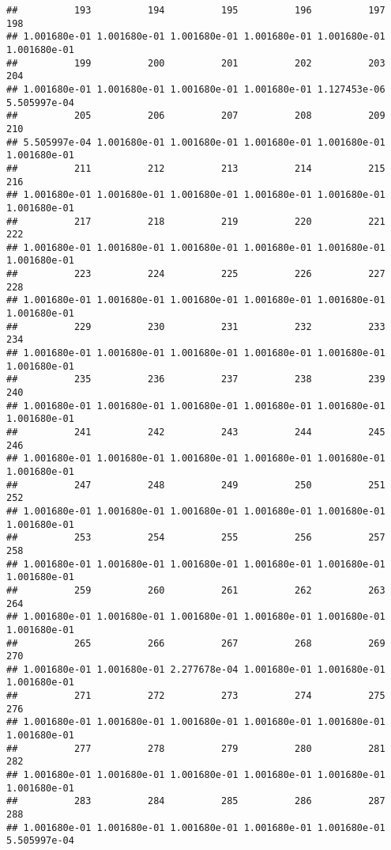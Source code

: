 \documentclass[
]{article}
\begin{document}
\begin{verbatim}
##          193          194          195          196          197          198 
## 1.001680e-01 1.001680e-01 1.001680e-01 1.001680e-01 1.001680e-01 1.001680e-01 
##          199          200          201          202          203          204 
## 1.001680e-01 1.001680e-01 1.001680e-01 1.001680e-01 1.127453e-06 5.505997e-04 
##          205          206          207          208          209          210 
## 5.505997e-04 1.001680e-01 1.001680e-01 1.001680e-01 1.001680e-01 1.001680e-01 
##          211          212          213          214          215          216 
## 1.001680e-01 1.001680e-01 1.001680e-01 1.001680e-01 1.001680e-01 1.001680e-01 
##          217          218          219          220          221          222 
## 1.001680e-01 1.001680e-01 1.001680e-01 1.001680e-01 1.001680e-01 1.001680e-01 
##          223          224          225          226          227          228 
## 1.001680e-01 1.001680e-01 1.001680e-01 1.001680e-01 1.001680e-01 1.001680e-01 
##          229          230          231          232          233          234 
## 1.001680e-01 1.001680e-01 1.001680e-01 1.001680e-01 1.001680e-01 1.001680e-01 
##          235          236          237          238          239          240 
## 1.001680e-01 1.001680e-01 1.001680e-01 1.001680e-01 1.001680e-01 1.001680e-01 
##          241          242          243          244          245          246 
## 1.001680e-01 1.001680e-01 1.001680e-01 1.001680e-01 1.001680e-01 1.001680e-01 
##          247          248          249          250          251          252 
## 1.001680e-01 1.001680e-01 1.001680e-01 1.001680e-01 1.001680e-01 1.001680e-01 
##          253          254          255          256          257          258 
## 1.001680e-01 1.001680e-01 1.001680e-01 1.001680e-01 1.001680e-01 1.001680e-01 
##          259          260          261          262          263          264 
## 1.001680e-01 1.001680e-01 1.001680e-01 1.001680e-01 1.001680e-01 1.001680e-01 
##          265          266          267          268          269          270 
## 1.001680e-01 1.001680e-01 2.277678e-04 1.001680e-01 1.001680e-01 1.001680e-01 
##          271          272          273          274          275          276 
## 1.001680e-01 1.001680e-01 1.001680e-01 1.001680e-01 1.001680e-01 1.001680e-01 
##          277          278          279          280          281          282 
## 1.001680e-01 1.001680e-01 1.001680e-01 1.001680e-01 1.001680e-01 1.001680e-01 
##          283          284          285          286          287          288 
## 1.001680e-01 1.001680e-01 1.001680e-01 1.001680e-01 1.001680e-01 5.505997e-04 

\end{verbatim}
\end{document}

